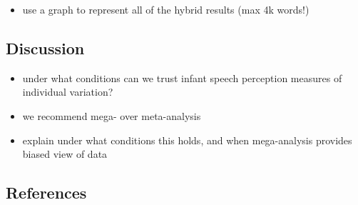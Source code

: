 \documentclass[man]{apa6}
\providecommand{\tightlist}{%
  \setlength{\itemsep}{0pt}\setlength{\parskip}{0pt}}
\begin{document}
\begin{itemize}
\tightlist
\item
  use a graph to represent all of the hybrid results (max 4k words!)
\end{itemize}

\subsection{Discussion}\label{discussion}

\begin{itemize}
\tightlist
\item
  under what conditions can we trust infant speech perception measures
  of individual variation?
\item
  we recommend mega- over meta-analysis
\item
  explain under what conditions this holds, and when mega-analysis
  provides biased view of data
\end{itemize}

\subsection{References}\label{references}

\setlength{\parindent}{-0.5in} \setlength{\leftskip}{0.5in}
\end{document}

